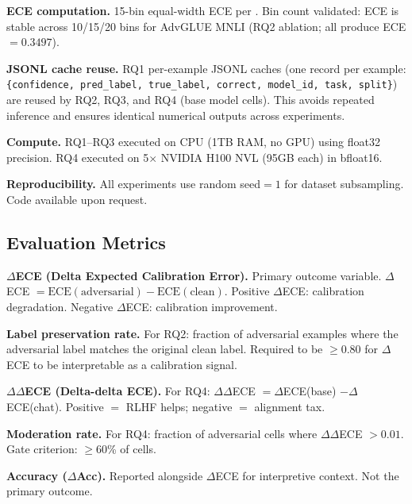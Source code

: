 \textbf{ECE computation.} 15-bin equal-width ECE per \citet{guo2017calibration}. Bin count validated: ECE is stable across 10/15/20 bins for AdvGLUE MNLI (RQ2 ablation; all produce ECE $= 0.3497$).

\textbf{JSONL cache reuse.} RQ1 per-example JSONL caches (one record per example: \texttt{\{confidence, pred\_label, true\_label, correct, model\_id, task, split\}}) are reused by RQ2, RQ3, and RQ4 (base model cells). This avoids repeated inference and ensures identical numerical outputs across experiments.

\textbf{Compute.} RQ1--RQ3 executed on CPU (1TB RAM, no GPU) using float32 precision. RQ4 executed on 5$\times$ NVIDIA H100 NVL (95GB each) in bfloat16.

\textbf{Reproducibility.} All experiments use random seed$=1$ for dataset subsampling. Code available upon request.

\subsection{Evaluation Metrics}

\textbf{$\Delta$ECE (Delta Expected Calibration Error).} Primary outcome variable. $\Delta$ECE $= \text{ECE}(\text{adversarial}) - \text{ECE}(\text{clean})$. Positive $\Delta$ECE: calibration degradation. Negative $\Delta$ECE: calibration improvement.

\textbf{Label preservation rate.} For RQ2: fraction of adversarial examples where the adversarial label matches the original clean label. Required to be $\geq$0.80 for $\Delta$ECE to be interpretable as a calibration signal.

\textbf{$\Delta\Delta$ECE (Delta-delta ECE).} For RQ4: $\Delta\Delta$ECE $= \Delta$ECE(base) $- \Delta$ECE(chat). Positive $=$ RLHF helps; negative $=$ alignment tax.

\textbf{Moderation rate.} For RQ4: fraction of adversarial cells where $\Delta\Delta$ECE $> 0.01$. Gate criterion: $\geq$60\% of cells.

\textbf{Accuracy ($\Delta$Acc).} Reported alongside $\Delta$ECE for interpretive context. Not the primary outcome.
